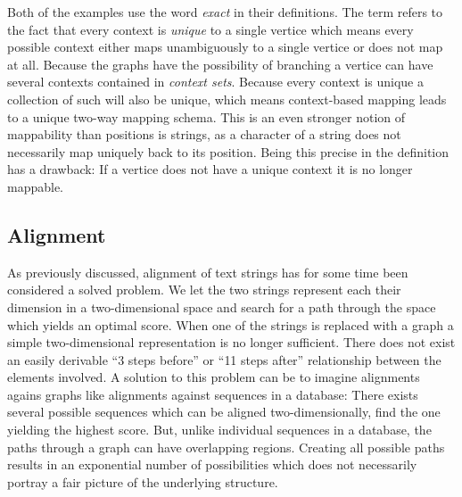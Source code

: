 \documentclass[thesis.tex]{subfiles}
\begin{document}
\par\noindent
Both of the examples use the word \textit{exact} in their definitions. The term refers to the fact that every context is \textit{unique} to a single vertice which means every possible context either maps unambiguously to a single vertice or does not map at all. Because the graphs have the possibility of branching a vertice can have several contexts contained in \textit{context sets}. Because every context is unique a collection of such will also be unique, which means context-based mapping leads to a unique two-way mapping schema. This is an even stronger notion of mappability than positions is strings, as a character of a string does not necessarily map uniquely back to its position. Being this precise in the definition has a drawback: If a vertice does not have a unique context it is no longer mappable. 
\subsection{Alignment}
As previously discussed, alignment of text strings has for some time been considered a solved problem. We let the two strings represent each their dimension in a two-dimensional space and search for a path through the space which yields an optimal score. When one of the strings is replaced with a graph a simple two-dimensional representation is no longer sufficient. There does not exist an easily derivable ``3 steps before'' or ``11 steps after'' relationship between the elements involved. A solution to this problem can be to imagine alignments agains graphs like alignments against sequences in a database: There exists several possible sequences which can be aligned two-dimensionally, find the one yielding the highest score. But, unlike individual sequences in a database, the paths through a graph can have overlapping regions. Creating all possible paths results in an exponential number of possibilities which does not necessarily portray a fair picture of the underlying structure.
\end{document}
